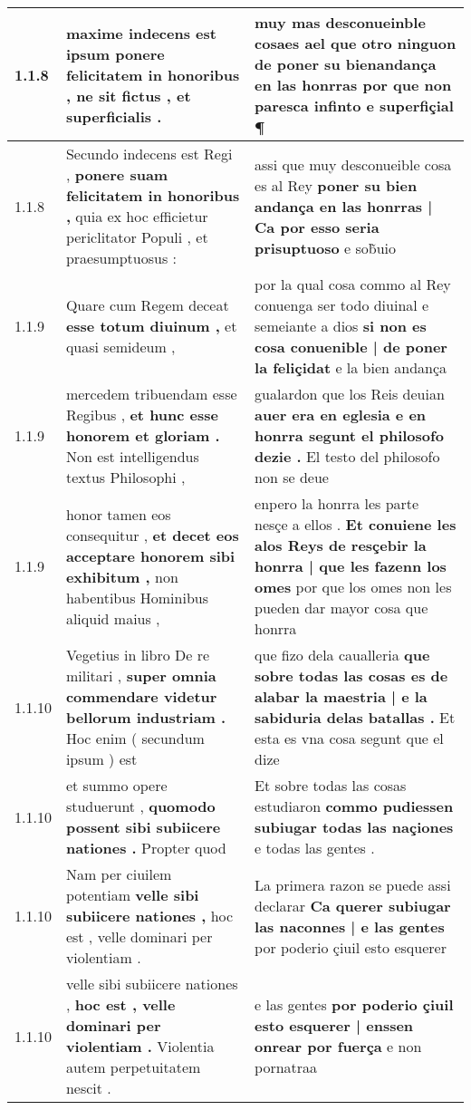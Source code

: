 \begin{tabular}{|p{1cm}|p{6.5cm}|p{6.5cm}|}
1.1.8 & maxime indecens est \textbf{ ipsum ponere felicitatem in honoribus , } ne sit fictus , et superficialis . & muy mas desconueinble cosaes ael \textbf{ que otro ninguon de poner su bienandança en las honrras } por que non paresca infinto e superfiçial ¶ \\\hline
1.1.8 & Secundo indecens est Regi , \textbf{ ponere suam felicitatem in honoribus , } quia ex hoc efficietur periclitator Populi , et praesumptuosus : & assi que muy desconueible cosa es al Rey \textbf{ poner su bien andança en las honrras | Ca por esso seria prisuptuoso } e sob̃uio \\\hline
1.1.9 & Quare cum Regem deceat \textbf{ esse totum diuinum , } et quasi semideum , & por la qual cosa commo al Rey conuenga ser todo diuinal e semeiante a dios \textbf{ si non es cosa conuenible | de poner la feliçidat } e la bien andança \\\hline
1.1.9 & mercedem tribuendam esse Regibus , \textbf{ et hunc esse honorem et gloriam . } Non est intelligendus textus Philosophi , & gualardon que los Reis deuian \textbf{ auer era en eglesia e en honrra segunt el philosofo dezie . } El testo del philosofo non se deue \\\hline
1.1.9 & honor tamen eos consequitur , \textbf{ et decet eos acceptare honorem sibi exhibitum , } non habentibus Hominibus aliquid maius , & enpero la honrra les parte nesçe a ellos . \textbf{ Et conuiene les alos Reys de resçebir la honrra | que les fazenn los omes } por que los omes non les pueden dar mayor cosa que honrra \\\hline
1.1.10 & Vegetius in libro De re militari , \textbf{ super omnia commendare videtur bellorum industriam . } Hoc enim ( secundum ipsum ) est & que fizo dela caualleria \textbf{ que sobre todas las cosas es de alabar la maestria | e la sabiduria delas batallas . } Et esta es vna cosa segunt que el dize \\\hline
1.1.10 & et summo opere studuerunt , \textbf{ quomodo possent sibi subiicere nationes . } Propter quod & Et sobre todas las cosas estudiaron \textbf{ commo pudiessen subiugar todas las naçiones } e todas las gentes . \\\hline
1.1.10 & Nam per ciuilem potentiam \textbf{ velle sibi subiicere nationes , } hoc est , velle dominari per violentiam . & La primera razon se puede assi declarar \textbf{ Ca querer subiugar las naconnes | e las gentes } por poderio çiuil esto esquerer \\\hline
1.1.10 & velle sibi subiicere nationes , \textbf{ hoc est , velle dominari per violentiam . } Violentia autem perpetuitatem nescit . & e las gentes \textbf{ por poderio çiuil esto esquerer | enssen onrear por fuerça } e non pornatraa \\\hline

\end{tabular}

